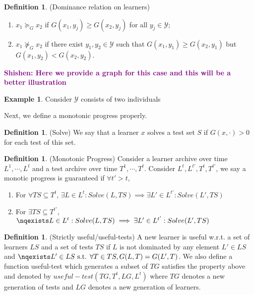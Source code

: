 \documentclass[a4paper,11pt]{report}
\theoremstyle{plain} %
\theoremstyle{definition} %
\newtheorem{defn}[thm]{Definition}
\newtheorem{eg}[thm]{Example}
\theoremstyle{remark} %
\newcommand{\shishen}[1]{\textbf{\textcolor{purple}{Shishen: #1}}}
\begin{document}
\begin{defn}(Dominance relation on learners) 
\begin{enumerate}
    \item $x_{1}\succeq_G x_{2}$ if $G(x_{1},y_{j})\geq G(x_{2},y_{j})$ for all $y_{j} \in \mathcal{Y}$;
    \item $x_{1}\nsucceq_{G} x_{2}$ if there exist $y_{1},y_{2} \in \mathcal{Y}$ such that $G(x_{1},y_{1})\geq G(x_{2},y_{1})$ but $G(x_{1},y_{2})< G(x_{2},y_{2})$.
\end{enumerate}

\end{defn}

\shishen{Here we provide a graph for this case and this will be a better illustration}
\begin{eg}Consider $\mathcal{Y}$ consists of two individuals

\end{eg}
\par Next, we define a monotonic progress properly.

\begin{defn}(Solve) We say that a learner $x$ solves a test set $S$ if $G(x,\cdot)>0$ for each test of this set.

\end{defn}

\begin{defn}(Monotonic Progress) Consider a learner archive over time $L^{1},\cdots ,L^{t}$ and a test archive over time $T^{1}, \cdots ,T^{t}$. Consider $L^{t}, L^{t'},T^{t}, T^{t'}$, we say a monotic progress is guaranteed if $\forall t'>t$, 
\begin{enumerate}
    \item For $\forall TS\subseteq T^{t} $, $\exists L \in L^{t}: Solve(L,TS) \implies \exists L' \in L^{t'}: Solve(L',TS)$  
    \item For $\exists TS\subseteq T^{t'} $, $\nqexists L \in L^{t}: Solve(L,TS) \implies \exists L' \in L^{t'}: Solve(L',TS)$  
\end{enumerate}
\end{defn}

\begin{defn}(Strictly useful/useful-tests) A new learner is useful w.r.t. a set of learners $LS$ and a set of tests $TS$ if $L$ is not dominated by any element $L' \in LS$ and $\nqexists L' \in LS \text{ s.t. } \forall T\in TS, G(L,T)=G(L',T)$. We also define a function useful-test which generates a subset of $TG$ satisfies the property above and denoted by $useful-test(TG,T^{t}, LG, L^{t})$ where $TG$ denotes a new generation of tests and $LG$ denotes a new generation of learners.
\end{defn}
\end{document}

